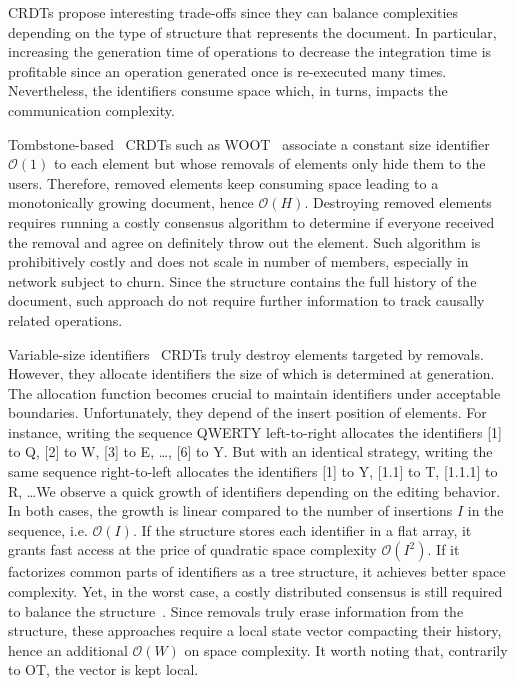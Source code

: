 \begin{asparadesc}
  CRDTs propose interesting trade-offs since they can balance complexities
  depending on the type of structure that represents the document.  In
  particular, increasing the generation time of operations to decrease the
  integration time is profitable since an operation generated once is
  re-executed many times. Nevertheless, the identifiers consume space which, in
  turns, impacts the communication complexity.

\item [Tombstone-based~\cite{ahmed2011evaluating, conway2014language,
    grishchenko2010deep, oster2006data, roh2011replicated, weiss2007wooki,
    wu2010partial, yu2012stringwise}] CRDTs such as WOOT~\cite{oster2006data}
  associate a constant size identifier $\mathcal{O}(1)$ to each element but
  whose removals of elements only hide them to the users. Therefore, removed
  elements keep consuming space leading to a monotonically growing document,
  hence $\mathcal{O}(H)$.  Destroying removed elements requires running a costly
  consensus algorithm to determine if everyone received the removal and agree on
  definitely throw out the element. Such algorithm is prohibitively costly and
  does not scale in number of members, especially in network subject to
  churn. Since the structure contains the full history of the document, such
  approach do not require further information to track causally related
  operations.

\item [Variable-size identifiers~\cite{mehdi2014merging, nedelec2013lseq,
    preguica2009commutative, weiss2009logoot}] CRDTs truly destroy elements
  targeted by removals. However, they allocate identifiers the size of which is
  determined at generation. The allocation function becomes crucial to maintain
  identifiers under acceptable boundaries. Unfortunately, they depend of the
  insert position of elements. For instance, writing the sequence QWERTY
  left-to-right allocates the identifiers [1] to Q, [2] to W, [3] to E, \ldots,
  [6] to Y. But with an identical strategy, writing the same sequence
  right-to-left allocates the identifiers [1] to Y, [1.1] to T, [1.1.1] to R,
  \ldots We observe a quick growth of identifiers depending on the editing
  behavior. In both cases, the growth is linear compared to the number of
  insertions $I$ in the sequence, i.e. $\mathcal{O}(I)$. If the structure stores
  each identifier in a flat array, it grants fast access at the price of
  quadratic space complexity $\mathcal{O}(I^2)$. If it factorizes common parts
  of identifiers as a tree structure, it achieves better space complexity. Yet,
  in the worst case, a costly distributed consensus is still required to balance
  the structure~\cite{zawirski2011asynchronous}. Since removals truly erase
  information from the structure, these approaches require a local state vector
  compacting their history, hence an additional $\mathcal{O}(W)$ on space
  complexity. It worth noting that, contrarily to OT, the vector is kept local.


\end{asparadesc}
